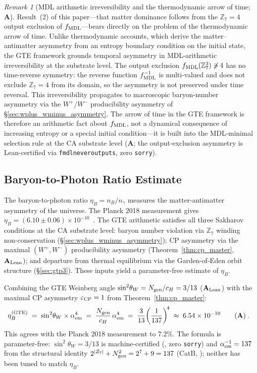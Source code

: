 \documentclass[11pt]{article}
\theoremstyle{remark}
\newtheorem{remark}[theorem]{Remark}
\newcommand{\Ngen}{N_{\rm gen}}
\newcommand{\cH}{c_H}
\newcommand{\lean}[1]{%
  \penalty-100
  \begingroup\def\_{\textunderscore\allowbreak}\texttt{#1}\endgroup}
\newcommand{\sinwsq}{\sin^2\!\theta_W}
\newcommand{\CatA}{\textbf{A}}
\newcommand{\CatAL}{\ensuremath{\textbf{A}_{\rm Lean}}}
\begin{document}
\begin{remark}[MDL arithmetic irreversibility and the thermodynamic arrow of time; $\CatA$]
\label{rem:time_arrow}
Result~(2) of this paper---that matter dominance follows from the $\mathbb{Z}_7 = 4$
output exclusion of $f_{\rm MDL}$---bears directly on the problem of the
thermodynamic arrow of time.
Unlike thermodynamic accounts, which derive the matter--antimatter asymmetry from an
entropy boundary condition on the initial state, the GTE framework grounds temporal
asymmetry in MDL-arithmetic irreversibility at the substrate level.
The output exclusion $f_{\rm MDL}(\mathbb{Z}_7^3) \not\ni 4$ has no time-reverse
symmetry: the reverse function $f_{\rm MDL}^{-1}$ is multi-valued and does not exclude
$\mathbb{Z}_7 = 4$ from its domain, so the asymmetry is not preserved under time
reversal.
This irreversibility propagates to macroscopic baryon-number asymmetry via the
$W^+/W^-$ producibility asymmetry of \S\ref{sec:wplus_wminus_asymmetry}.
The arrow of time in the GTE framework is therefore an arithmetic fact about
$f_{\rm MDL}$, not a dynamical consequence of increasing entropy or a special initial
condition---it is built into the MDL-minimal selection rule at the CA substrate level
($\CatA$; the output-exclusion asymmetry is Lean-certified via
\lean{fmdl\_never\_outputs\_4}, zero \texttt{sorry}).
\end{remark}

\subsection{Baryon-to-Photon Ratio Estimate}
\label{sec:baryon_photon_ratio}

The baryon-to-photon ratio $\eta_B = n_B/n_\gamma$ measures the
matter-antimatter asymmetry of the universe.
The Planck 2018 measurement gives
$\eta_B = (6.10 \pm 0.06)\times 10^{-10}$~\cite{Planck2018Params}.
The GTE arithmetic satisfies all three Sakharov conditions at the CA substrate
level: baryon number violation via $\mathbb{Z}_7$ winding non-conservation
(\S\ref{sec:wplus_wminus_asymmetry}); CP asymmetry via the maximal
$(W^+, W^-)$ producibility asymmetry (Theorem~\ref{thm:cp_master}, $\CatAL$);
and departure from thermal equilibrium via the Garden-of-Eden orbit structure
(\S\ref{sec:gtp3}).
These inputs yield a parameter-free estimate of $\eta_B$.

Combining the GTE Weinberg angle $\sinwsq = \Ngen/\cH = 3/13$
\cite{SpivackWeinberg} ($\CatAL$) with the maximal CP asymmetry
$\varepsilon_{\rm CP} = 1$ from Theorem~\ref{thm:cp_master}:
\begin{equation}
  \eta_B^{(\mathrm{GTE})}
  \;=\; \sinwsq \times \alpha_{\rm em}^4
  \;=\; \frac{\Ngen}{\cH}\,\alpha_{\rm em}^4
  \;=\; \frac{3}{13}\!\left(\frac{1}{137}\right)^{\!4}
  \;\approx\; 6.54\times 10^{-10}
  \qquad (\CatA)\;.
  \label{eq:eta_B_gte}
\end{equation}
This agrees with the Planck 2018 measurement to $7.2\%$.
The formula is parameter-free: $\sinwsq = 3/13$ is machine-certified
(\cite{SpivackWeinberg}, zero \texttt{sorry}) and $\alpha_{\rm em}^{-1} = 137$
from the structural identity $2^{|Z_7|}+N_{\rm gen}^2 = 2^7+9 = 137$ (CatB,
\cite{SpivackWeinbergAngle}); neither has been tuned to match $\eta_B$.
\end{document}
